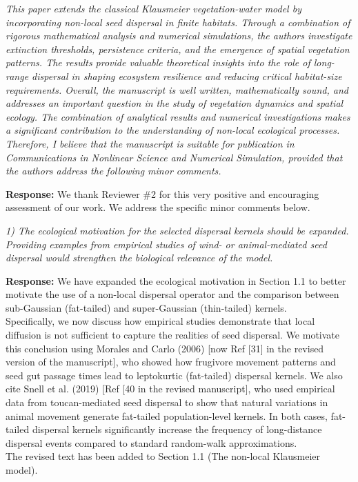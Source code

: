 \documentclass[11pt,a4paper]{article}
\newcommand{\comment}[1]{\vspace{0.5em}\noindent\textit{\textcolor{revcolor}{#1}}}
\newcommand{\response}[1]{\vspace{0.5em}\noindent\textbf{\textcolor{authorcolor}{Response:}} \textcolor{authorcolor}{#1}}
\begin{document}
\comment{This paper extends the classical Klausmeier vegetation-water model by incorporating non-local seed dispersal in finite habitats. Through a combination of rigorous mathematical analysis and numerical simulations, the authors investigate extinction thresholds, persistence criteria, and the emergence of spatial vegetation patterns. The results provide valuable theoretical insights into the role of long-range dispersal in shaping ecosystem resilience and reducing critical habitat-size requirements. Overall, the manuscript is well written, mathematically sound, and addresses an important question in the study of vegetation dynamics and spatial ecology. The combination of analytical results and numerical investigations makes a significant contribution to the understanding of non-local ecological processes. Therefore, I believe that the manuscript is suitable for publication in Communications in Nonlinear Science and Numerical Simulation, provided that the authors address the following minor comments.}

\response{We thank Reviewer \#2 for this very positive and encouraging assessment of our work. We address the specific minor comments below.}

\comment{1) The ecological motivation for the selected dispersal kernels should be expanded. Providing examples from empirical studies of wind- or animal-mediated seed dispersal would strengthen the biological relevance of the model.}

\response{We have expanded the ecological motivation in Section 1.1 to better motivate the use of a non-local dispersal operator and the comparison between sub-Gaussian (fat-tailed) and super-Gaussian (thin-tailed) kernels.\\
Specifically, we now discuss how empirical studies demonstrate that local diffusion is not sufficient to capture the realities of seed dispersal. We motivate this conclusion using Morales and Carlo (2006) [now Ref [31] in the revised version of the manuscript], who showed how frugivore movement patterns and seed gut passage times lead to leptokurtic (fat-tailed) dispersal kernels. We also cite Snell et al. (2019) [Ref [40 in the revised manuscript], who used empirical data from toucan-mediated seed dispersal to show that natural variations in animal movement generate fat-tailed population-level kernels. In both cases, fat-tailed dispersal kernels significantly increase the frequency of long-distance dispersal events compared to standard random-walk approximations. \\
The revised text has been added to Section 1.1 (The non-local Klausmeier model).}
\end{document}
